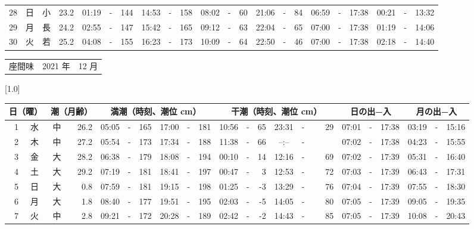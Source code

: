 \documentclass[12pt,a4j]{jsarticle}
\begin{document}
\begin{table}[htbp]
\begin{center}
{\begin{tabular}{|rc|cr|ccrccr|ccrccr|ccc|ccc|}
28 & 日 & 小 & 23.2 &  01:19 &-& 144 &  14:53 &-& 158 &  08:02 &-&  60 &  21:06 &-&  84 & 06:59 & -& 17:38 & 00:21 & -& 13:32 \\
29 & 月 & 長 & 24.2 &  02:55 &-& 147 &  15:42 &-& 165 &  09:12 &-&  63 &  22:04 &-&  65 & 07:00 & -& 17:38 & 01:19 & -& 14:06 \\
30 & 火 & 若 & 25.2 &  04:08 &-& 155 &  16:23 &-& 173 &  10:09 &-&  64 &  22:50 &-&  46 & 07:00 & -& 17:38 & 02:18 & -& 14:40 \\
   \hline
   \end{tabular}}
   \end{center}
\end{table}
\newpage
 \begin{table}[htbp]
 \begin{center}
 \begin{tabular}{lcc}
 \LARGE{座間味}  & \large{2021 年} & \large{12 月} \\
 \end{tabular}
 \end{center}
 \begin{center}
    \scalebox{0.7}[1.0]{
    \begin{tabular}{|rc|cr|ccrccr|ccrccr|ccc|ccc|}
    \hline
    \multicolumn{2}{|c|}{日（曜）} & \multicolumn{2}{c|}{潮（月齢）} & \multicolumn{6}{c|}{満潮（時刻、潮位 cm）} & \multicolumn{6}{c|}{干潮（時刻、潮位 cm）} & \multicolumn{3}{c|}{日の出−入} &  \multicolumn{3}{c|}{月の出−入}\\
 \hline
 1 & 水 & 中 & 26.2 &  05:05 &-& 165 &  17:00 &-& 181 &  10:56 &-&  65 &  23:31 &-&  29 & 07:01 & -& 17:38 & 03:19 & -& 15:16 \\
 2 & 木 & 中 & 27.2 &  05:54 &-& 173 &  17:34 &-& 188 &  11:38 &-&  66 &  --:-- &-&~~~~~ & 07:02 & -& 17:38 & 04:23 & -& 15:55 \\
 3 & 金 & 大 & 28.2 &  06:38 &-& 179 &  18:08 &-& 194 &  00:10 &-&  14 &  12:16 &-&  69 & 07:02 & -& 17:39 & 05:31 & -& 16:40 \\
 4 & 土 & 大 & 29.2 &  07:19 &-& 181 &  18:41 &-& 197 &  00:47 &-&   3 &  12:53 &-&  72 & 07:03 & -& 17:39 & 06:43 & -& 17:31 \\
 5 & 日 & 大 &  0.8 &  07:59 &-& 181 &  19:15 &-& 198 &  01:25 &-&  -3 &  13:29 &-&  76 & 07:04 & -& 17:39 & 07:55 & -& 18:30 \\
 6 & 月 & 大 &  1.8 &  08:40 &-& 177 &  19:51 &-& 195 &  02:03 &-&  -5 &  14:05 &-&  80 & 07:05 & -& 17:39 & 09:05 & -& 19:35 \\
 7 & 火 & 中 &  2.8 &  09:21 &-& 172 &  20:28 &-& 189 &  02:42 &-&  -2 &  14:43 &-&  85 & 07:05 & -& 17:39 & 10:08 & -& 20:43 \\

\end{tabular}}
\end{center}
\end{table}
\end{document}
